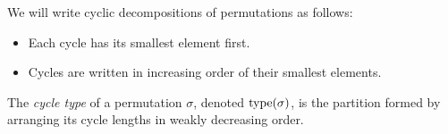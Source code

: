 \begin{notation}
    We will write cyclic decompositions of permutations as follows:
    \begin{itemize}
        \item Each cycle has its smallest element first.
        \item Cycles are written in increasing order of their smallest
            elements.
    \end{itemize}
\end{notation}

\begin{definition*}
    The \emph{cycle type} of a permutation $\sigma$, denoted
    $\operatorname{type}(\sigma)$, is the partition formed by arranging its cycle lengths
    in weakly decreasing order.
\end{definition*}
